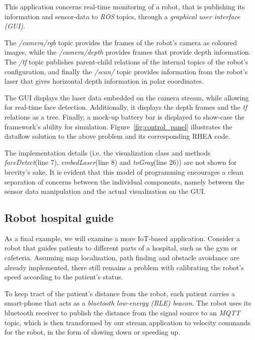 \documentclass[sigplan,review,anonymous,screen]{acmart}
\begin{document}
This application concerns real-time monitoring of a robot, that is publishing
its information and sensor-data to \textit{ROS} topics, through a
\textit{graphical user interface (GUI)}.

The \textit{/camera/rgb} topic provides the frames of the robot's camera as
coloured images, while the \textit{/camera/depth} provides frames that provide
depth information. The \textit{/tf} topic publishes parent-child relations of
the internal topics of the robot's configuration, and finally the
\textit{/scan/} topic provides information from the robot's laser that gives
horizontal depth information in polar coordinates.

The GUI displays the laser data embedded on the camera stream, while allowing
for real-time face detection. Additionally, it displays the depth frames and the
\textit{tf} relations as a tree. Finally, a mock-up battery bar is displayed to
show-case the framework's ability for simulation. Figure~\ref{fig:control_panel}
illustrates the dataflow solution to the above problem and its corresponding
\textsc{RHEA} code.


The implementation details (i.e. the visualization class and methods
\textit{faceDetect}(line 7), \textit{embedLaser}(line 8) and
\textit{toGray}(line 26)) are not shown for brevity's sake. It is evident that
this model of programming encourages a clean separation of concerns between the
individual components, namely between the sensor data manipulation and the
actual visualization on the GUI.

\subsection{Robot hospital guide}

As a final example, we will examine a more IoT-based application. Consider a
robot that guides patients to different parts of a hospital, such as the gym or
cafeteria. Assuming map localization, path finding and obstacle avoidance are
already implemented, there still remains a problem with calibrating the robot's
speed according to the patient's status.

To keep tract of the patient's distance from the robot, each patient carries a
smart-phone that acts as a \textit{bluetooth low-energy (BLE) beacon}. The robot
uses its bluetooth receiver to publish the distance from the signal source to an
\textit{MQTT} topic, which is then transformed by our stream application to
velocity commands for the robot, in the form of slowing down or speeding up.
\end{document}
